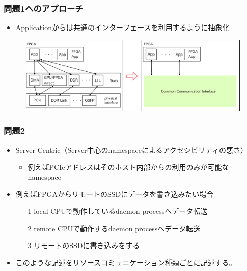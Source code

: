 \documentclass[dvipdfmx,9pt,notheorems]{beamer}
\theoremstyle{definition}
\begin{document}
\begin{frame}\frametitle{問題1へのアプローチ}
	\begin{itemize}
		\item Applicationからは共通のインターフェースを利用するように抽象化
	\end{itemize}
  \begin{figure}[htb]
		\includegraphics[width=\linewidth]{fig/ez_FPGA_common_communication_interface.pdf}
  \end{figure}
	\pnote{
	}
\end{frame}

\begin{frame}\frametitle{問題2}
	\begin{itemize}
		\item Server-Centric（Server中心のnamespaceによるアクセシビリティの悪さ）
			\begin{itemize}
				\item 例えばPCIeアドレスはそのホスト内部からの利用のみが可能なnamespace
			\end{itemize}
			\item 例えばFPGAからリモートのSSDにデータを書き込みたい場合
			\begin{itemize}
				\item[1] local CPUで動作しているdaemon processへデータ転送
				\item[2] remote CPUで動作するdaemon processへデータ転送
				\item[3] リモートのSSDに書き込みをする
			\end{itemize}
			\item このような記述をリソースコミュニケーション種類ごとに記述する。
	\end{itemize}
	\pnote{
	}
\end{frame}
\end{document}

